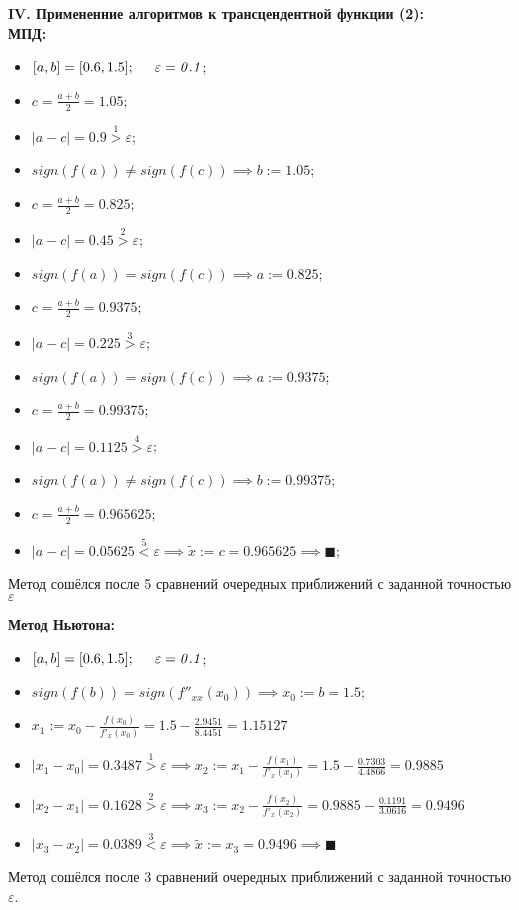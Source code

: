 {\large\bf{IV. Примененние алгоритмов к трансцендентной функции (2):}}\\
{\bf МПД:}
\begin{itemize}
    \item $[a, b]=[0.6, 1.5]; \hspace{0.5cm} \varepsilon = \mathit{0.1}$;
    \item $c=\frac{a+b}{2}=1.05;$
    \item $|a-c|=\mathbf{0.9}\stackrel{1}{>}\varepsilon$;
    \item $sign(f(a)) \ne sign(f(c))\implies b:=1.05$;
    \item $c=\frac{a+b}{2}=0.825;$
    \item $|a-c|=\mathbf{0.45}\stackrel{2}{>}\varepsilon$;
    \item $sign(f(a)) = sign(f(c))\implies a:=0.825$;
    \item $c=\frac{a+b}{2}=0.9375;$
    \item $|a-c|=\mathbf{0.225}\stackrel{3}{>}\varepsilon$;
    \item $sign(f(a)) = sign(f(c))\implies a:=0.9375$;
    \item $c=\frac{a+b}{2}=0.99375;$
    \item $|a-c|=\mathbf{0.1125}\stackrel{4}{>}\varepsilon$;
    \item $sign(f(a)) \ne sign(f(c))\implies b:=0.99375$;
    \item $c=\frac{a+b}{2}=0.965625;$
    \item $|a-c|= \mathbf{0.05625} \stackrel{5}{<} \varepsilon \implies \widetilde{x} := c = \mathit{0.965625} \implies \blacksquare$;
\end{itemize}
Метод сошёлся после 5 сравнений очередных приближений с заданной точностью $\varepsilon$

{\bf Метод Ньютона:}
\begin{itemize}
    \item $[a, b]=[0.6, 1.5]; \hspace{0.5cm} \varepsilon = \mathit{0.1}$;
    \item $sign(f(b))=sign(f''_{xx}(x_0)) \implies x_0 := b = 1.5;$
    \item $x_1 := x_0 - \frac{f(x_0)}{f'_x(x_0)} = 1.5 - \frac{2.9451}{8.4451} = 1.15127$
    \item $|x_1-x_0| = \mathbf{0.3487} \stackrel{1}{>} \varepsilon \implies x_2 := x_1 - \frac{f(x_1)}{f'_x(x_1)} = 1.5 - \frac{0.7303}{4.4866} = 0.9885$
    \item $|x_2-x_1| = \mathbf{0.1628} \stackrel{2}{>} \varepsilon \implies x_3 := x_2 - \frac{f(x_2)}{f'_x(x_2)} = 0.9885 - \frac{0.1191}{3.0616} = 0.9496$
    \item $|x_3-x_2| = \mathbf{0.0389} \stackrel{3}{<} \varepsilon \implies\widetilde{x}:=x_3=\mathit{0.9496}\implies\blacksquare$
\end{itemize}
Метод сошёлся после 3 сравнений очередных приближений с заданной точностью $\varepsilon$.

